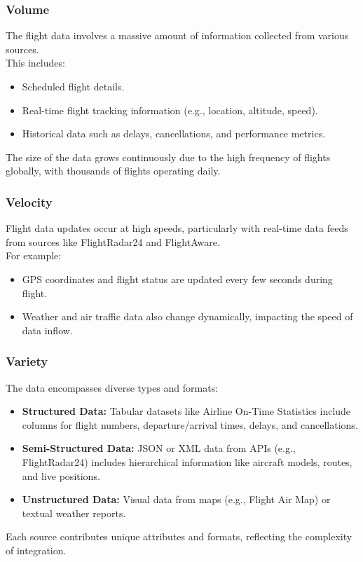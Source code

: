 \documentclass[12pt,a4paper]{article}
\begin{document}
\subsubsection{Volume}
The flight data involves a massive amount of information collected from various
sources.\\
This includes:
\begin{itemize}
    \item Scheduled flight details.
    \item Real-time flight tracking information (e.g., location, altitude,
    speed).
    \item Historical data such as delays, cancellations, and performance
    metrics.
\end{itemize}
The size of the data grows continuously due to the high frequency of flights
globally, with thousands of flights operating daily.

\subsubsection{Velocity}
Flight data updates occur at high speeds, particularly with real-time data feeds
from sources like FlightRadar24 and FlightAware.\\
For example:
\begin{itemize}
    \item GPS coordinates and flight status are updated every few seconds during
    flight.
    \item Weather and air traffic data also change dynamically, impacting the
    speed of data inflow.
\end{itemize}

\subsubsection{Variety}
The data encompasses diverse types and formats:
\begin{itemize}
    \item \textbf{Structured Data:} Tabular datasets like Airline On-Time
    Statistics include columns for flight numbers, departure/arrival times,
    delays, and cancellations.
    \item \textbf{Semi-Structured Data:} JSON or XML data from APIs (e.g.,
    FlightRadar24) includes hierarchical information like aircraft models,
    routes, and live positions.
    \item \textbf{Unstructured Data:} Visual data from maps (e.g., Flight Air
    Map) or textual weather reports.
\end{itemize}
Each source contributes unique attributes and formats, reflecting the complexity
of integration.
\end{document}

